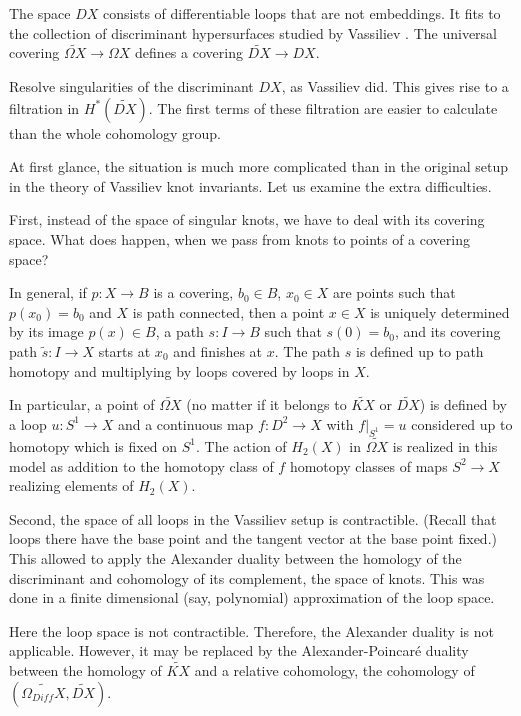 \documentclass{article}
\begin{document}
The space $DX$ 
consists of differentiable loops that are not embeddings. It fits to 
the collection of discriminant hypersurfaces studied by Vassiliev \cite{Va}.
The universal covering $\widetilde{\Omega X}\to \Omega X$ defines 
a covering $\widetilde{DX}\to DX$.

Resolve singularities of the discriminant $DX$, as Vassiliev
did. This gives rise to a filtration in $H^*(\widetilde{DX})$.
The first terms of these filtration are easier to calculate than the whole
cohomology group.


At first glance, the situation is much more complicated than 
in the original setup in the theory of Vassiliev knot invariants. 
Let us examine the extra difficulties.

First, instead of the space of singular knots, we have to deal with its
covering space. What does happen, when we pass from knots to
points of a covering space? 

In general, if $p:X\to B$ is a covering, $b_0\in B$, $x_0\in X$ are points 
such that
$p(x_0)=b_0$ and $X$ is path connected, then a point $x\in X$ is uniquely
determined by its image $p(x)\in B$, a path $s:I\to B$ such that $s(0)=b_0$,
and its covering path $\widetilde s:I\to X$ starts at $x_0$ and finishes
at $x$. The path $s$ is defined up to path homotopy and multiplying by loops 
covered by loops in $X$.

In particular, a point of $\widetilde{\Omega X}$ (no matter if it belongs
to $\widetilde{KX}$ or $\widetilde{DX}$) is defined by a loop
$u:S^1\to X$ and a continuous map $f:D^2\to X$ with $f|_{S^1}=u$
considered up to homotopy which is fixed on $S^1$. 
The action of $H_2(X)$ in $\widetilde{\Omega X}$ is realized in this model
as addition to the homotopy class of $f$ 
homotopy classes of  maps $S^2\to X$ realizing elements of $H_2(X)$. 

Second, the space of all loops in the Vassiliev setup is contractible.
(Recall that loops there have the base point and the tangent vector at the
base point fixed.) This allowed to apply the Alexander duality between the
homology of the discriminant and cohomology of its complement, the space of
knots. This was done in a finite dimensional (say, polynomial)
approximation of the loop space.

Here the loop space is not contractible. Therefore, the Alexander duality  
is not applicable. However, it may be replaced by the Alexander-Poincar\'e
duality between the homology of $\widetilde{KX}$ and a relative cohomology, 
the cohomology of $(\widetilde{\Omega_{Diff} X},\widetilde{DX})$.
\end{document}

